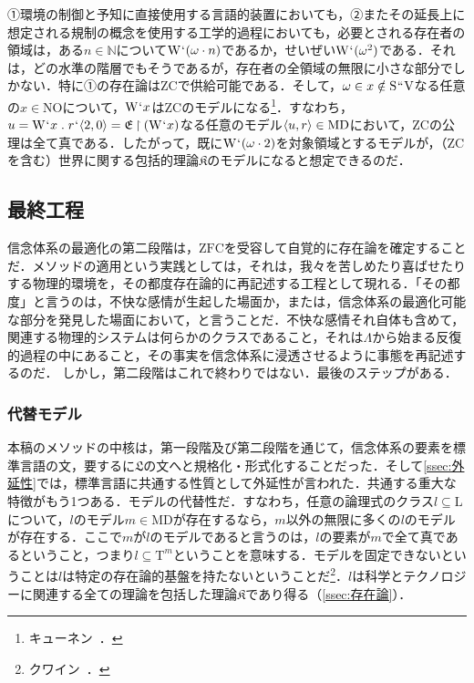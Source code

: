 ①環境の制御と予知に直接使用する言語的装置においても，②またその延長上に想定される規制の概念を使用する工学的過程においても，必要とされる存在者の領域は，ある$n\in\mathbb{N}$について$ \mathrm{W}{\mspace{1mu}{`}\mspace{1mu}}(\omega\cdot n) $であるか，せいぜい$ \mathrm{W}{\mspace{1mu}{`}\mspace{1mu}}(\omega^{2}) $である．それは，どの水準の階層でもそうであるが，存在者の全領域の無限に小さな部分でしかない．特に①の存在論はZCで供給可能である．そして，$ \omega\in x\notin \mathrm{S}{\mspace{1mu}{``}\mspace{1mu}}\mathrm{V} $なる任意の$x\in\mathrm{NO}$について，$\mathrm{W}{\mspace{1mu}{`}\mspace{1mu}} x$はZCのモデルになる\footnote{
    キューネン~\cite[p.\,192]{キューネン}．
}．すなわち，$ u = \mathrm{W}\fap x\con{1}r\fap\orp{2,0} = \mathfrak{E}\uphr(\mathrm{W}\fap x) $なる任意のモデル$ \langle u,r \rangle\in\mathrm{MD} $において，ZCの公理は全て真である．したがって，既に$ \mathrm{W}{\mspace{1mu}{`}\mspace{1mu}}(\omega\cdot 2) $を対象領域とするモデルが，（ZCを含む）世界に関する包括的理論$ \mathfrak{K} $のモデルになると想定できるのだ．

\subsection{最終工程}
\label{ssec:最終工程}

信念体系の最適化の第二段階は，$\mathrm{ZFC}$を受容して自覚的に存在論を確定することだ．メソッドの適用という実践としては，それは，我々を苦しめたり喜ばせたりする物理的環境を，その都度存在論的に再記述する工程として現れる．「その都度」と言うのは，不快な感情が生起した場面か，または，信念体系の最適化可能な部分を発見した場面において，と言うことだ．不快な感情それ自体も含めて，関連する物理的システムは何らかのクラスであること，それは$ \Lambda $から始まる反復的過程の中にあること，その事実を信念体系に浸透させるように事態を再記述するのだ．
しかし，第二段階はこれで終わりではない．最後のステップがある．

\subsubsection{代替モデル}
\label{sssec:代替モデル}

本稿のメソッドの中核は，第一段階及び第二段階を通じて，信念体系の要素を標準言語の文，要するに$\mathfrak{L}$の文へと規格化・形式化することだった．そして\ref{ssec:外延性}では，標準言語に共通する性質として外延性が言われた．共通する重大な特徴がもう1つある．モデルの代替性だ．すなわち，任意の論理式のクラス$ l\subseteq\mathrm{L} $について，$l$のモデル$m\in\mathrm{MD}$が存在するなら，$m$以外の無限に多くの$l$のモデルが存在する．ここで$m$が$l$のモデルであると言うのは，$l$の要素が$m$で全て真であるということ，つまり$ l\subseteq\mathrm{T}^{m} $ということを意味する．モデルを固定できないということは$l$は特定の存在論的基盤を持たないということだ\footnote{
    クワイン~\cite[pp.\,44-46]{クワインe}．
}．$l$は科学とテクノロジーに関連する全ての理論を包括した理論$\mathfrak{K}$であり得る（\ref{ssec:存在論}）．

